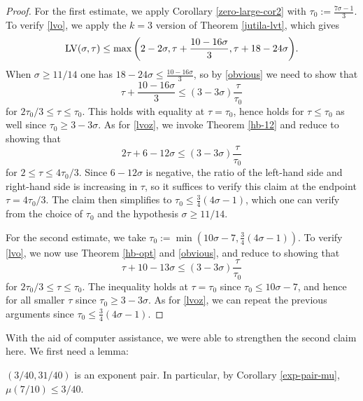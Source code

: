 \begin{proof} For the first estimate, we apply Corollary \ref{zero-large-cor2} with $\tau_0 := \frac{7\sigma-1}{3}$.  To verify \eqref{lvo}, we apply the $k=3$ version of Theorem \ref{jutila-lvt}, which gives
$$ \mathrm{LV}(\sigma,\tau) \leq \max \bigg( 2-2\sigma, \tau + \frac{10-16\sigma}{3}, \tau + 18-24\sigma \bigg).$$
When $\sigma \geq 11/14$ one has $18-24\sigma \leq \frac{10-16\sigma}{3}$, so by \eqref{obvious} we need to show that
$$ \tau + \frac{10-16\sigma}{3} \leq (3-3\sigma) \frac{\tau}{\tau_0}$$
for $2\tau_0/3 \leq \tau \leq \tau_0$.  This holds with equality at $\tau=\tau_0$, hence holds for $\tau \leq \tau_0$ as well since $\tau_0 \geq 3-3\sigma$.  As for \eqref{lvoz}, we invoke Theorem \ref{hb-12} and reduce to showing that
$$ 2\tau + 6 - 12\sigma \leq (3-3\sigma) \frac{\tau}{\tau_0}$$
for $2 \leq \tau \leq 4\tau_0/3$.  Since $6-12\sigma$ is negative, the ratio of the left-hand side and right-hand side is increasing in $\tau$, so it suffices to verify this claim at the endpoint $\tau = 4\tau_0/3$.  The claim then simplifies to $\tau_0 \leq \frac{3}{4} (4\sigma-1)$, which one can verify from the choice of $\tau_0$ and the hypothesis $\sigma \geq 11/14$.

For the second estimate, we take $\tau_0 := \min( 10\sigma-7, \frac{3}{4} (4\sigma-1))$.  To verify \eqref{lvo}, we now use Theorem \ref{hb-opt} and \eqref{obvious}, and reduce to showing that
$$ \tau + 10-13\sigma \leq (3-3\sigma) \frac{\tau}{\tau_0}$$
for $2\tau_0/3 \leq \tau \leq \tau_0$.  The inequality holds at $\tau=\tau_0$ since $\tau_0 \leq 10\sigma-7$, and hence for all smaller $\tau$ since $\tau_0 \geq 3-3\sigma$.  As for \eqref{lvoz}, we can repeat the previous arguments since $\tau_0 \leq \frac{3}{4} (4\sigma-1)$.
\end{proof}

With the aid of computer assistance, we were able to strengthen the second claim here.  We first need a lemma:

\begin{lemma}\label{3-40} $(3/40, 31/40)$ is an exponent pair.  In particular, by Corollary \ref{exp-pair-mu}, $\mu(7/10) \leq 3/40$.
\end{lemma}

\derived
{}

